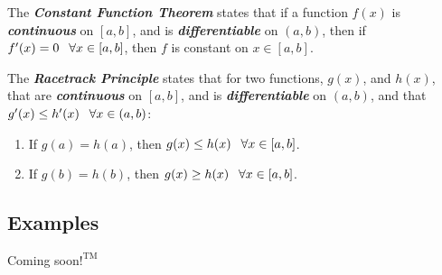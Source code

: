 \vspace{0.1in}
The \textbf{\textit{Constant Function Theorem}} states that if a function $f(x)$ is \textbf{\textit{continuous}} on $[a, b]$, and is \textbf{\textit{differentiable}} on $(a, b)$, then if $f^\prime(x) = 0 \hphantom{-} \forall x \in [a, b]$, then $f$ is constant on $x \in [a, b]$.

\vspace{0.1in}
The \textbf{\textit{Racetrack Principle}} states that for two functions, $g(x)$, and $h(x)$, that are \textbf{\textit{continuous}} on $[a, b]$, and is \textbf{\textit{differentiable}} on $(a, b)$, and that $g^\prime(x) \leq h^\prime(x) \hphantom{-} \forall x \in (a, b)$:
%
\begin{enumerate}
\item If $g(a) = h(a)$, then $g(x) \leq h(x) \hphantom{-} \forall x \in [a, b]$.\\
\vspace{-0.25in}
\item If $g(b) = h(b)$, then $g(x) \geq h(x) \hphantom{-} \forall x \in [a,b]$.
\end{enumerate}
%

\begin{center}
\section*{\small Examples}
Coming soon$!^{\text{TM}}$
\end{center}